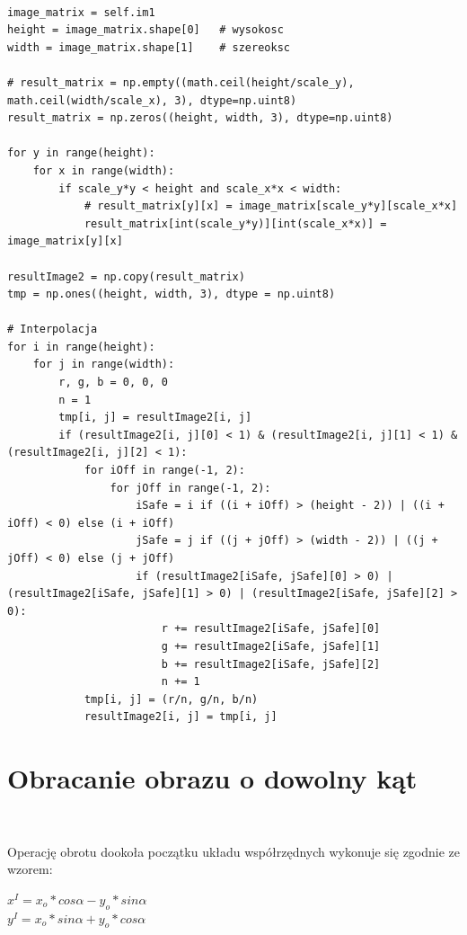 \documentclass[final,a4paper,openany,12pt]{mwbk}
\begin{document}
\begin{lstlisting}[caption= Niejednorodne skalowanie obrazu]

image_matrix = self.im1
height = image_matrix.shape[0]   # wysokosc
width = image_matrix.shape[1]    # szereoksc

# result_matrix = np.empty((math.ceil(height/scale_y), math.ceil(width/scale_x), 3), dtype=np.uint8)
result_matrix = np.zeros((height, width, 3), dtype=np.uint8)

for y in range(height):
    for x in range(width): 
        if scale_y*y < height and scale_x*x < width:
            # result_matrix[y][x] = image_matrix[scale_y*y][scale_x*x]
            result_matrix[int(scale_y*y)][int(scale_x*x)] = image_matrix[y][x]

resultImage2 = np.copy(result_matrix)
tmp = np.ones((height, width, 3), dtype = np.uint8)

# Interpolacja
for i in range(height):
    for j in range(width):
        r, g, b = 0, 0, 0
        n = 1
        tmp[i, j] = resultImage2[i, j]
        if (resultImage2[i, j][0] < 1) & (resultImage2[i, j][1] < 1) & (resultImage2[i, j][2] < 1):
            for iOff in range(-1, 2):
                for jOff in range(-1, 2):
                    iSafe = i if ((i + iOff) > (height - 2)) | ((i + iOff) < 0) else (i + iOff)
                    jSafe = j if ((j + jOff) > (width - 2)) | ((j + jOff) < 0) else (j + jOff)
                    if (resultImage2[iSafe, jSafe][0] > 0) | (resultImage2[iSafe, jSafe][1] > 0) | (resultImage2[iSafe, jSafe][2] > 0):
                        r += resultImage2[iSafe, jSafe][0]
                        g += resultImage2[iSafe, jSafe][1]
                        b += resultImage2[iSafe, jSafe][2]
                        n += 1
            tmp[i, j] = (r/n, g/n, b/n)
            resultImage2[i, j] = tmp[i, j]

\end{lstlisting}


\section{ Obracanie obrazu o dowolny kąt}
\hfill\\
\indent

Operację obrotu dookoła początku układu współrzędnych wykonuje się zgodnie ze wzorem:
	
	\begin{center}
		$x^I = x_{o} * cos\alpha - y_{o} * sin\alpha$\\
		$y^I = x_{o} * sin\alpha + y_{o} * cos\alpha$
	\end{center}
	
\end{document}

